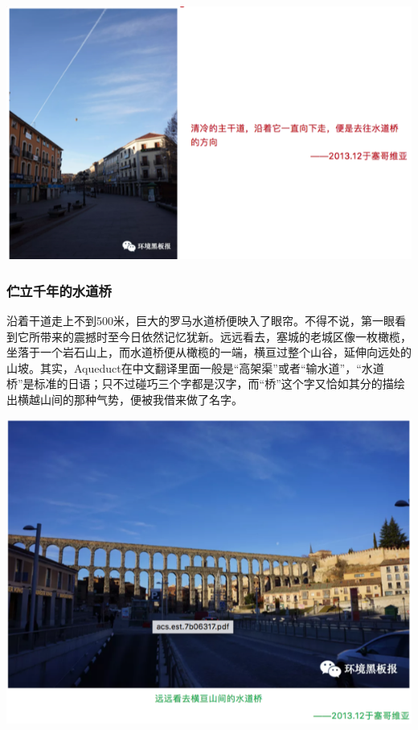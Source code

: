 \documentclass[]{book}
\begin{document}
\includegraphics[width=8.33in]{images/xt43}

\hypertarget{ux4f2bux7acbux5343ux5e74ux7684ux6c34ux9053ux6865}{%
\subsubsection{伫立千年的水道桥}\label{ux4f2bux7acbux5343ux5e74ux7684ux6c34ux9053ux6865}}

沿着干道走上不到500米，巨大的罗马水道桥便映入了眼帘。不得不说，第一眼看到它所带来的震撼时至今日依然记忆犹新。远远看去，塞城的老城区像一枚橄榄，坐落于一个岩石山上，而水道桥便从橄榄的一端，横亘过整个山谷，延伸向远处的山坡。其实，Aqueduct在中文翻译里面一般是``高架渠''或者``输水道''，``水道桥''是标准的日语；只不过碰巧三个字都是汉字，而``桥''这个字又恰如其分的描绘出横越山间的那种气势，便被我借来做了名字。

\includegraphics[width=8.33in]{images/xt44}
\end{document}
